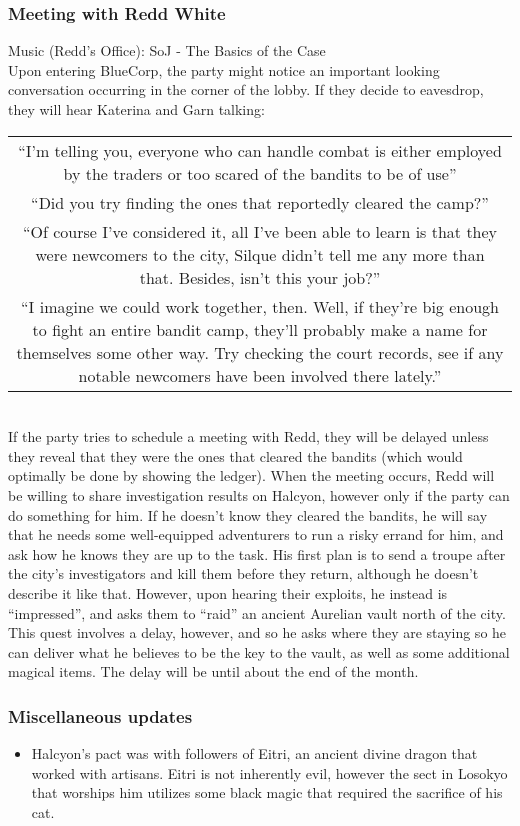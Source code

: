 \subsubsection{Meeting with Redd White}
Music (Redd's Office): SoJ - The Basics of the Case\\
Upon entering BlueCorp, the party might notice an important looking conversation occurring in the corner of the lobby. If they decide to eavesdrop, they will hear Katerina and Garn talking:\\
\begin{tabular}{c}
``I'm telling you, everyone who can handle combat is either employed by the traders or too scared of the bandits to be of use''\\
``Did you try finding the ones that reportedly cleared the camp?''\\
``Of course I've considered it, all I've been able to learn is that they were newcomers to the city, Silque didn't tell me any more than that. Besides, isn't this your job?''\\
``I imagine we could work together, then. Well, if they're big enough to fight an entire bandit camp, they'll probably make a name for themselves some other way. Try checking the court records, see if any notable newcomers have been involved there lately.''
\end{tabular}\\
If the party tries to schedule a meeting with Redd, they will be delayed unless they reveal that they were the ones that cleared the bandits (which would optimally be done by showing the ledger). When the meeting occurs, Redd will be willing to share investigation results on Halcyon, however only if the party can do something for him. If he doesn't know they cleared the bandits, he will say that he needs some well-equipped adventurers to run a risky errand for him, and ask how he knows they are up to the task. His first plan is to send a troupe after the city's investigators and kill them before they return, although he doesn't describe it like that. However, upon hearing their exploits, he instead is ``impressed'', and asks them to ``raid'' an ancient Aurelian vault north of the city. This quest involves a delay, however, and so he asks where they are staying so he can deliver what he believes to be the key to the vault, as well as some additional magical items. The delay will be until about the end of the month.

\subsubsection{Miscellaneous updates}
\begin{itemize}
\item Halcyon's pact was with followers of Eitri, an ancient divine dragon that worked with artisans. Eitri is not inherently evil, however the sect in Losokyo that worships him utilizes some black magic that required the sacrifice of his cat.
\end{itemize}